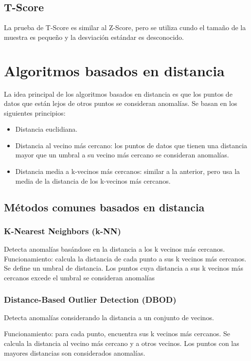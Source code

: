 \subsection{T-Score}
La prueba de T-Score es similar al Z-Score, pero se utiliza cundo el tamaño de la muestra es pequeño y la desviación estándar es desconocido.


\section{Algoritmos basados en distancia}

La idea principal de los algoritmos basados en distancia es que los puntos de datos que están lejos de otros puntos se consideran anomalías. Se basan en los siguientes principios:

\begin{itemize}
    \item  Distancia euclidiana.
    \item Distancia al vecino más cercano: los puntos de datos que tienen una distancia mayor que un umbral a su vecino más cercano se consideran anomalías.

    \item Distancia media a k-vecinos más cercanos: similar a la anterior, pero usa la media de la distancia de los k-vecinos más cercanos.
\end{itemize}

\subsection{Métodos comunes basados en distancia}
\subsubsection{K-Nearest Neighbors (k-NN)}
Detecta anomalías basándose en la distancia a los k vecinos más cercanos.
Funcionamiento: calcula la distancia de cada punto a sus k vecinos más cercanos. Se define un umbral de distancia. Los puntos cuya distancia a sus k vecinos más cercanos excede el umbral se consideran anomalías

\subsubsection{Distance-Based Outlier Detection (DBOD)}
Detecta anomalías considerando la distancia a un conjunto de vecinos.

Funcionamiento: para cada punto, encuentra sus k vecinos más cercanos. Se calcula la distancia al vecino más cercano y a otros vecinos. Los puntos con las mayores distancias son considerados anomalías.

